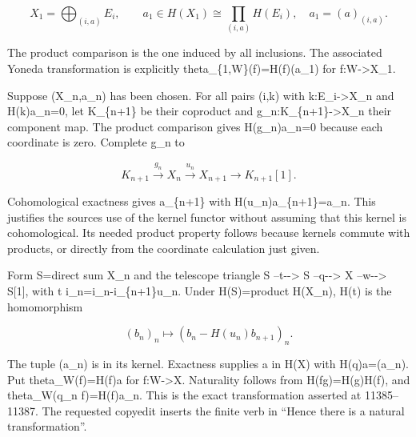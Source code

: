 \[
 X_1=\bigoplus_{(i,a)}E_i,\qquad
 a_1\in H(X_1)\cong\prod_{(i,a)}H(E_i),\quad
 a_1=(a)_{(i,a)}.
\]

The product comparison is the one induced by all inclusions. The associated Yoneda transformation is explicitly theta\_\allowbreak{}\{1,\allowbreak{}W\}(f)\allowbreak{}\allowbreak{}=H(f)\allowbreak{}(a\_\allowbreak{}1)\allowbreak{} for f:\allowbreak{}W\allowbreak{}->X\_\allowbreak{}1.

Suppose (X\_\allowbreak{}n,\allowbreak{}a\_\allowbreak{}n)\allowbreak{} has been chosen. For all pairs (i,\allowbreak{}k)\allowbreak{} with k:\allowbreak{}E\_\allowbreak{}i\allowbreak{}->X\_\allowbreak{}n and H(k)\allowbreak{}a\_\allowbreak{}n\allowbreak{}=0,\allowbreak{} let K\_\allowbreak{}\{n\allowbreak{}+1\} be their coproduct and g\_\allowbreak{}n:\allowbreak{}K\_\allowbreak{}\{n\allowbreak{}+1\}\allowbreak{}->X\_\allowbreak{}n their component map. The product comparison gives H(g\_\allowbreak{}n)\allowbreak{}a\_\allowbreak{}n\allowbreak{}=0 because each coordinate is zero. Complete g\_\allowbreak{}n to

\[
 K_{n+1}\xrightarrow{g_n}X_n\xrightarrow{u_n}X_{n+1}
                       \longrightarrow K_{n+1}[1].
\]

Cohomological exactness gives a\_\allowbreak{}\{n\allowbreak{}+1\} with H(u\_\allowbreak{}n)\allowbreak{}a\_\allowbreak{}\{n\allowbreak{}+1\}\allowbreak{}=a\_\allowbreak{}n. This justifies the source\textquotesingle s use of the kernel functor without assuming that this kernel is cohomological. Its needed product property follows because kernels commute with products,\allowbreak{} or directly from the coordinate calculation just given.

Form S\allowbreak{}=direct sum X\_\allowbreak{}n and the telescope triangle S --t-\allowbreak{}-> S --q-\allowbreak{}-> X --w-\allowbreak{}-> S[1]\allowbreak{},\allowbreak{} with t i\_\allowbreak{}n\allowbreak{}=i\_\allowbreak{}n-i\_\allowbreak{}\{n\allowbreak{}+1\}u\_\allowbreak{}n. Under H(S)\allowbreak{}\allowbreak{}=product H(X\_\allowbreak{}n)\allowbreak{},\allowbreak{} H(t)\allowbreak{} is the homomorphism

\[
 (b_n)_n\longmapsto
           (b_n-H(u_n)b_{n+1})_n .
\]

The tuple (a\_\allowbreak{}n)\allowbreak{} is in its kernel. Exactness supplies a in H(X)\allowbreak{} with H(q)\allowbreak{}a\allowbreak{}=(a\_\allowbreak{}n)\allowbreak{}. Put theta\_\allowbreak{}W(f)\allowbreak{}\allowbreak{}=H(f)\allowbreak{}a for f:\allowbreak{}W\allowbreak{}->X. Naturality follows from H(fg)\allowbreak{}\allowbreak{}=H(g)\allowbreak{}H(f)\allowbreak{},\allowbreak{} and theta\_\allowbreak{}W(q\_\allowbreak{}n f)\allowbreak{}\allowbreak{}=H(f)\allowbreak{}a\_\allowbreak{}n. This is the exact transformation asserted at 11385–\allowbreak{}11387. The requested copyedit inserts the finite verb in ``Hence there is a natural transformation''.


